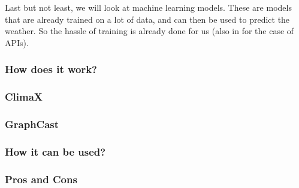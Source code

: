\documentclass[../paper.tex]{subfiles}
\begin{document}
    Last but not least, we will look at machine learning models.
    These are models that are already trained on a lot of data, and can then be used to predict the weather.
    So the hassle of training is already done for us (also in for the case of APIs).

    \subsubsection{How does it work?}

    \subsubsection{ClimaX}

    \subsubsection{GraphCast}

    \subsubsection{How it can be used?}

    \subsubsection{Pros and Cons}
\end{document}
